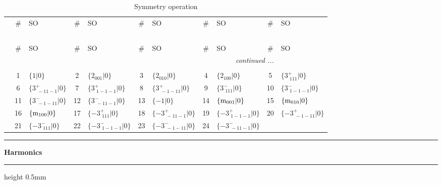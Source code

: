 \documentclass[fleqn,10pt,landscape]{jsarticle}
\begin{document}
\renewcommand{\arraystretch}{1.6}
\begin{longtable}[l]{c|cl|cl|cl|cl|cl}
\captionsetup{justification=raggedright, singlelinecheck=off}
\caption{Symmetry operation}
 \\
 \hline \hline
 & \# & SO & \# & SO & \# & SO & \# & SO & \# & SO \\ \hline \endfirsthead

\multicolumn{10}{l}{\tablename\ \thetable{}} \\
 \hline \hline
 & \# & SO & \# & SO & \# & SO & \# & SO & \# & SO \\ \hline \endhead

 \hline \hline
\multicolumn{10}{r}{\footnotesize\it continued ...} \\ \endfoot

 \hline \hline
\multicolumn{10}{r}{} \\ \endlastfoot

 & 1 & $\{1|0\}$ & 2 & $\{2{}_{001}|0\}$ & 3 & $\{2{}_{010}|0\}$ & 4 & $\{2{}_{100}|0\}$ & 5 & $\{3^{+}_{\,\,111}|0\}$ \\
& 6 & $\{3^{+}_{\,\,-11-1}|0\}$ & 7 & $\{3^{+}_{\,\,1-1-1}|0\}$ & 8 & $\{3^{+}_{\,\,-1-11}|0\}$ & 9 & $\{3^{-}_{\,\,111}|0\}$ & 10 & $\{3^{-}_{\,\,1-1-1}|0\}$ \\
& 11 & $\{3^{-}_{\,\,-1-11}|0\}$ & 12 & $\{3^{-}_{\,\,-11-1}|0\}$ & 13 & $\{-1|0\}$ & 14 & $\{{\rm m}_{001}|0\}$ & 15 & $\{{\rm m}_{010}|0\}$ \\
& 16 & $\{{\rm m}_{100}|0\}$ & 17 & $\{-3^{+}_{\,\,111}|0\}$ & 18 & $\{-3^{+}_{\,\,-11-1}|0\}$ & 19 & $\{-3^{+}_{\,\,1-1-1}|0\}$ & 20 & $\{-3^{+}_{\,\,-1-11}|0\}$ \\
& 21 & $\{-3^{-}_{\,\,111}|0\}$ & 22 & $\{-3^{-}_{\,\,1-1-1}|0\}$ & 23 & $\{-3^{-}_{\,\,-1-11}|0\}$ & 24 & $\{-3^{-}_{\,\,-11-1}|0\}$ &  &  \\
\end{longtable}
\vspace{5mm}
\noindent \rule[0.5mm]{5mm}{0.5mm}\hspace{3mm}\textbf{Harmonics}\hspace{3mm}\leaders\hrule height 0.5mm\hfill\kern0pt
\vspace{3mm}
\end{document}
